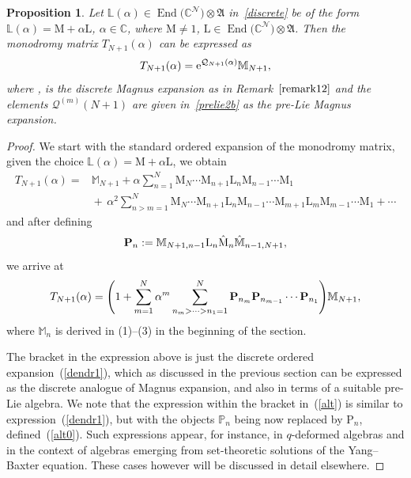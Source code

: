 \documentclass[pdftex]{sigma}
\numberwithin{equation}{section}
\newtheorem{pro}[thm]{Proposition}
\theoremstyle{definition}
\DeclareMathOperator{\EEnd}{End}%
\begin{document}
\begin{pro}
Let ${\mathbb L}(\alpha)\in \EEnd\bigl({\mathbb C}^{\mathcal N}\bigr) \otimes {\mathfrak A}$ in~\eqref{discrete} be of the form ${\mathbb L}(\alpha) = {\mathrm M} + \alpha {\mathrm L}$, $\alpha \in {\mathbb C}$, where ${\mathrm M}\neq 1$, ${\mathrm L}\in \EEnd\bigl({\mathbb C}^{\mathcal N}\bigr) \otimes {\mathfrak A}$. Then the monodromy matrix $T_{N+1}(\alpha)$ can be expressed as
\begin{equation*}
T_{N+1}(\alpha) ={\rm e}^{{\mathcal Q}_{N+1}(\alpha)}{\mathbb M}_{N+1},
\end{equation*}
where ,  is the discrete Magnus expansion as in Remark~$\ref{remark12}$ and the elements ${\mathcal Q}^{(m)}(N+1)$ are given in~\eqref{prelie2b} as the pre-Lie Magnus expansion.
\end{pro}
\begin{proof}

We start with the standard ordered expansion of the monodromy matrix, given the choice ${\mathbb L}(\alpha)= {\mathrm M} + \alpha {\mathrm L}$, we obtain
\begin{align*}
T_{N+1}(\alpha)={}& {\mathbb M}_{N+1} + \alpha\sum_{n=1}^N {\mathrm M}_{N} \cdots {\mathrm M}_{n+1} {\mathrm L}_n {\mathrm M}_{n-1} \cdots {\mathrm M}_1 \nonumber\\
&{}{+}\, \alpha^2 \sum_{n>m=1}^N {\mathrm M}_N \cdots {\mathrm M}_{n+1}{\mathrm L}_n {\mathrm M}_{n-1} \cdots {\mathrm M}_{m+1} {\mathrm L}_m {\mathrm M}_{m-1} \cdots {\mathrm M}_1 + \cdots
\end{align*}
and after defining
\begin{equation}
{\bf P}_n := {\mathbb M}_{N+1,n-1}{\mathrm L}_n \hat {\mathrm M}_n \hat {\mathbb M}_{n-1, N+1}, \label{alt0}
\end{equation}
we arrive at
\begin{gather}
T_{N+1}(\alpha) = \Biggl(1+ \sum_{m=1}^N\alpha^m \sum_{n_m>\dots >n_1=1}^N{\bf P}_{n_m} {\bf P}_{n_{m-1}} \cdots {\bf P}_{n_1} \Biggr){\mathbb M}_{N+1}, \label{alt}
\end{gather}
where ${\mathbb M}_n$ is derived in (1)--(3) in the beginning of the section.

The bracket in the expression above is just the discrete ordered expansion~(\ref{dendr1}), which as discussed in the previous section can be expressed as the discrete analogue of Magnus expansion, and also in terms of a suitable pre-Lie algebra.
{We note that the expression within the bracket in~(\ref{alt}) is similar to expression~(\ref{dendr1}), but with the objects
${\mathbb P}_n$ being now replaced by ${\mathrm P}_n$, defined~(\ref{alt0}).} Such expressions appear, for instance, in $q$-deformed algebras and in the context of algebras emerging from set-theoretic solutions of the Yang--Baxter equation. These cases however will be discussed in detail elsewhere.
\end{proof}
\end{document}
